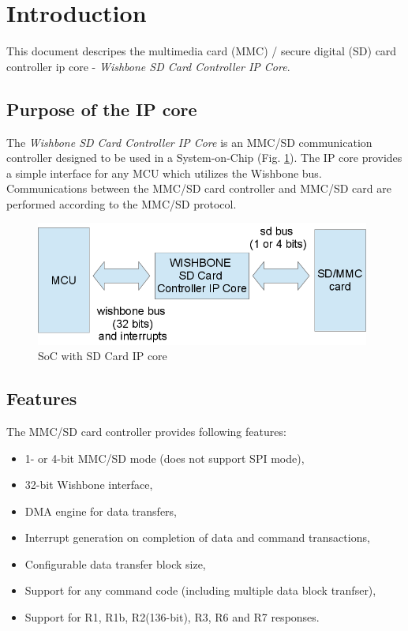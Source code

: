 \section{Introduction}
\label{sec:introduction}

    This document descripes the multimedia card (MMC) / secure digital (SD) card controller ip core - \textit{Wishbone SD Card Controller IP Core}.

    \subsection{Purpose of the IP core}
    \label{sec:purpose}

    The \textit{Wishbone SD Card Controller IP Core} is an MMC/SD communication controller designed to be used in a System-on-Chip (Fig. \ref{img:ip_core}).
    The IP core provides a simple interface for any MCU which utilizes the Wishbone bus. Communications between the MMC/SD card controller and MMC/SD card 
    are performed according to the MMC/SD protocol.
    
    \begin{figure}[H]
        \centering
        \includegraphics[width=11cm]{../bin/ip_core.png}
        \caption{SoC with SD Card IP core}
        \label{img:ip_core}
    \end{figure}
    
    \subsection{Features}
    \label{sec:fetures}
    The MMC/SD card controller provides following features:
    
    \begin{itemize}
     \item 1- or 4-bit MMC/SD mode (does not support SPI mode),
     \item 32-bit Wishbone interface,
     \item DMA engine for data transfers,
     \item Interrupt generation on completion of data and command transactions,
     \item Configurable data transfer block size,
     \item Support for any command code (including multiple data block tranfser),
     \item Support for R1, R1b, R2(136-bit), R3, R6 and R7 responses.
    \end{itemize}
